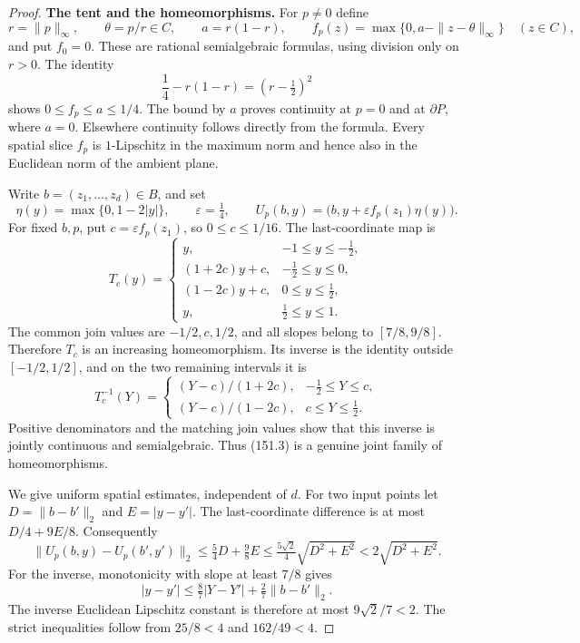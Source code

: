 \begin{proof}
\textbf{The tent and the homeomorphisms.}
For $p\ne0$ define
\[
 r=\|p\|_\infty,\qquad \theta=p/r\in C,\qquad
 a=r(1-r),\qquad
 f_p(z)=\max\{0,a-\|z-\theta\|_\infty\}\quad(z\in C),
 \tag{151.1}
\]
and put $f_0=0$. These are rational semialgebraic formulas, using
division only on $r>0$. The identity
\[
           \frac14-r(1-r)=(r-\tfrac12)^2
 \tag{151.2}
\]
shows $0\le f_p\le a\le1/4$. The bound by $a$ proves continuity
at $p=0$ and at $\partial P$, where $a=0$. Elsewhere continuity
follows directly from the formula. Every spatial slice $f_p$ is
$1$-Lipschitz in the maximum norm and hence also in the Euclidean
norm of the ambient plane.

Write $b=(z_1,\ldots,z_d)\in B$, and set
\[
 \eta(y)=\max\{0,1-2|y|\},\qquad \varepsilon=\tfrac14,\qquad
 U_p(b,y)=\bigl(b,y+\varepsilon f_p(z_1)\eta(y)\bigr).
 \tag{151.3}
\]
For fixed $b,p$, put $c=\varepsilon f_p(z_1)$, so
$0\le c\le1/16$. The last-coordinate map is
\[
 T_c(y)=
 \begin{cases}
 y,&-1\le y\le-\tfrac12,\\
 (1+2c)y+c,&-\tfrac12\le y\le0,\\
 (1-2c)y+c,&0\le y\le\tfrac12,\\
 y,&\tfrac12\le y\le1.
 \end{cases}
 \tag{151.4}
\]
The common join values are $-1/2,c,1/2$, and all slopes belong to
$[7/8,9/8]$. Therefore $T_c$ is an increasing homeomorphism.
Its inverse is the identity outside $[-1/2,1/2]$, and on the
two remaining intervals it is
\[
 T_c^{-1}(Y)=
 \begin{cases}
 (Y-c)/(1+2c),&-\tfrac12\le Y\le c,\\
 (Y-c)/(1-2c),&c\le Y\le\tfrac12.
 \end{cases}
 \tag{151.5}
\]
Positive denominators and the matching join values show that
this inverse is jointly continuous and semialgebraic. Thus
(151.3) is a genuine joint family of homeomorphisms.

We give uniform spatial estimates, independent of $d$.
For two input points let $D=\|b-b'\|_2$ and $E=|y-y'|$.
The last-coordinate difference is at most
$D/4+9E/8$. Consequently
\[
 \|U_p(b,y)-U_p(b',y')\|_2
 \le \tfrac54D+\tfrac98E
 \le\tfrac{5\sqrt2}{4}\sqrt{D^2+E^2}<2\sqrt{D^2+E^2}.
 \tag{151.6}
\]
For the inverse, monotonicity with slope at least $7/8$ gives
\[
 |y-y'|\le\tfrac87|Y-Y'|+\tfrac27\|b-b'\|_2.
\]
The inverse Euclidean Lipschitz constant is therefore at most
$9\sqrt2/7<2$. The strict inequalities follow from
$25/8<4$ and $162/49<4$.


\end{proof}

